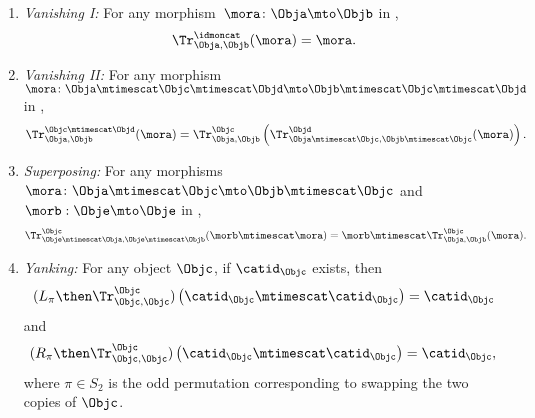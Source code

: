 \begin{ctdefinition}
\begin{enumerate}
        \item \emph{Vanishing I:}
              For any morphism~$\mora \colon \Obja\mto \Objb$ in \CatC,
              \begin{equation}
                  \label{eq:semicat-trace-vanishing_1}
                  \Tr_{\Obja,\Objb}^\idmoncat (\mora)=\mora.
              \end{equation}

        \item \emph{Vanishing II:}
              For any morphism~$\mora \colon \Obja\mtimescat \Objc \mtimescat \Objd \mto \Objb\mtimescat \Objc \mtimescat \Objd$ in \CatC,
              \begin{equation}
                  \label{eq:semicat-trace-vanishing_2}
                  \Tr_{\Obja,\Objb}^{\Objc\mtimescat \Objd}(\mora)=\Tr_{\Obja,\Objb}^\Objc\left(
                  \Tr_{\Obja \mtimescat \Objc , \Objb \mtimescat \Objc}^\Objd(\mora)\right).
              \end{equation}

        \item \emph{Superposing:}
              For any morphisms~$\mora\colon \Obja\mtimescat \Objc \mto \Objb\mtimescat \Objc$ and $\morb : \Obje \mto \Obje$ in \CatC,
              \begin{equation}
                  \label{eq:semicat-trace-superposing}
                  \Tr_{\Obje\mtimescat \Obja,\Obje\mtimescat \Objb}^{\Objc}(\morb \mtimescat \mora)=\morb \mtimescat \Tr_{\Obja,\Objb}^\Objc(\mora).
              \end{equation}

        \item \emph{Yanking:}
              For any object $\Objc$, if $\catid_\Objc$ exists, then
              \begin{equation}
                  \label{eq:semicat-trace-yanking-I}
                  (L_\pi  \then \Tr_{\Objc,\Objc}^\Objc)\left(\catid_\Objc \mtimescat \catid_\Objc \right)=\catid_\Objc
              \end{equation}
              and
              \begin{equation}
                  \label{eq:semicat-trace-yanking-II}
                  (R_\pi  \then \Tr_{\Objc,\Objc}^\Objc)\left(\catid_\Objc \mtimescat \catid_\Objc \right)=\catid_\Objc,
              \end{equation}
              where $\pi \in S_2$ is the odd permutation corresponding to swapping the two copies of $\Objc$.
    \end{enumerate}
\end{ctdefinition}


